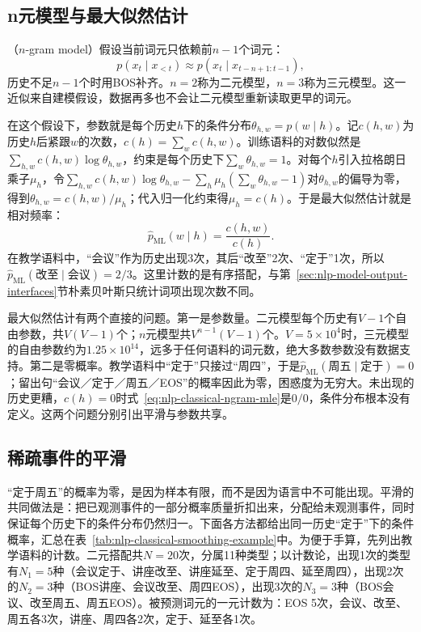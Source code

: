 \subsection{n元模型与最大似然估计}
\label{sec:nlp-classical-ngram-mle}

（$n$-gram model）假设当前词元只依赖前$n-1$个词元：
\begin{equation}
  p(x_t\mid x_{<t})\approx p(x_t\mid x_{t-n+1:t-1}),
  \label{eq:nlp-classical-ngram}
\end{equation}
历史不足$n-1$个时用BOS补齐。$n=2$称为二元模型，$n=3$称为三元模型。这一近似来自建模假设，数据再多也不会让二元模型重新读取更早的词元。

在这个假设下，参数就是每个历史$h$下的条件分布$\theta_{h,w}=p(w\mid h)$。记$c(h,w)$为历史$h$后紧跟$w$的次数，$c(h)=\sum_w c(h,w)$。训练语料的对数似然是$\sum_{h,w}c(h,w)\log\theta_{h,w}$，约束是每个历史下$\sum_w\theta_{h,w}=1$。对每个$h$引入拉格朗日乘子$\mu_h$，令$\sum_{h,w}c(h,w)\log\theta_{h,w}-\sum_h\mu_h(\sum_w\theta_{h,w}-1)$对$\theta_{h,w}$的偏导为零，得到$\theta_{h,w}=c(h,w)/\mu_h$；代入归一化约束得$\mu_h=c(h)$。于是最大似然估计就是相对频率：
\begin{equation}
  \hat p_{\mathrm{ML}}(w\mid h)=\frac{c(h,w)}{c(h)}.
  \label{eq:nlp-classical-ngram-mle}
\end{equation}
在教学语料中，“会议”作为历史出现3次，其后“改至”2次、“定于”1次，所以$\hat p_{\mathrm{ML}}(\text{改至}\mid\text{会议})=2/3$。这里计数的是有序搭配，与第~\ref{sec:nlp-model-output-interfaces}节朴素贝叶斯只统计词项出现次数不同。

最大似然估计有两个直接的问题。第一是参数量。二元模型每个历史有$V-1$个自由参数，共$V(V-1)$个；$n$元模型共$V^{n-1}(V-1)$个。$V=5\times10^4$时，三元模型的自由参数约为$1.25\times10^{14}$，远多于任何语料的词元数，绝大多数参数没有数据支持。第二是零概率。教学语料中“定于”只接过“周四”，于是$\hat p_{\mathrm{ML}}(\text{周五}\mid\text{定于})=0$；留出句“会议／定于／周五／EOS”的概率因此为零，困惑度为无穷大。未出现的历史更糟，$c(h)=0$时式~\eqref{eq:nlp-classical-ngram-mle}是$0/0$，条件分布根本没有定义。这两个问题分别引出平滑与参数共享。

\subsection{稀疏事件的平滑}
\label{sec:nlp-classical-smoothing}

“定于周五”的概率为零，是因为样本有限，而不是因为语言中不可能出现。平滑的共同做法是：把已观测事件的一部分概率质量折扣出来，分配给未观测事件，同时保证每个历史下的条件分布仍然归一。下面各方法都给出同一历史“定于”下的条件概率，汇总在表~\ref{tab:nlp-classical-smoothing-example}中。为便于手算，先列出教学语料的计数。二元搭配共$N=20$次，分属11种类型；以计数论，出现1次的类型有$N_1=5$种（会议定于、讲座改至、讲座延至、定于周四、延至周四），出现2次的$N_2=3$种（BOS讲座、会议改至、周四EOS），出现3次的$N_3=3$种（BOS会议、改至周五、周五EOS）。被预测词元的一元计数为：EOS 5次，会议、改至、周五各3次，讲座、周四各2次，定于、延至各1次。

